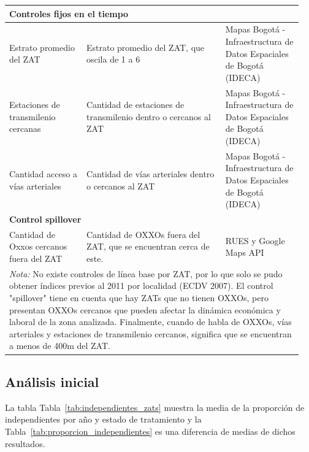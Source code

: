 \documentclass{article}
\begin{document}
\begin{longtable}{p{0.25\linewidth} p{0.45\linewidth} p{0.25\linewidth}}
\midrule
\multicolumn{3}{l}{\textbf{Controles fijos en el tiempo}} \\
\midrule
Estrato promedio del ZAT & Estrato promedio del ZAT, que oscila de 1 a 6 & Mapas Bogotá - Infraestructura de Datos Espaciales de Bogotá (IDECA) \\
\midrule
Estaciones de transmilenio cercanas & Cantidad de estaciones de transmilenio dentro o cercanos al ZAT & Mapas Bogotá - Infraestructura de Datos Espaciales de Bogotá (IDECA) \\
\midrule
Cantidad acceso a vías arteriales & Cantidad de vías arteriales dentro o cercanos al ZAT & Mapas Bogotá - Infraestructura de Datos Espaciales de Bogotá (IDECA) \\
\midrule
\multicolumn{3}{l}{\textbf{Control spillover}} \\
\midrule
Cantidad de Oxxos cercanos fuera del ZAT & Cantidad de OXXOs fuera del ZAT, que se encuentran cerca de este. & RUES y Google Maps API \\
\bottomrule
\multicolumn{3}{p{\linewidth}}{%
\vspace{0.5em}
\footnotesize{ \textit{Nota:} No existe controles de línea base por ZAT, por lo que solo se pudo obtener índices previos al 2011 por localidad (ECDV 2007). El control "spillover" tiene en cuenta que hay ZATs que no tienen OXXOs, pero presentan OXXOs cercanos que pueden afectar la dinámica económica y laboral de la zona analizada. Finalmente, cuando de habla de OXXOs, vías arteriales y estaciones de transmilenio cercanos, significa que se encuentran a menos de 400m del ZAT.}}
\end{longtable}



\subsection{Análisis inicial}

La tabla Tabla~\ref{tab:independientes_zats} muestra la media de la proporción de independientes por año y estado de tratamiento y la Tabla~\ref{tab:proporcion_independientes} es una diferencia de medias de dichos resultados.  
\end{document}
